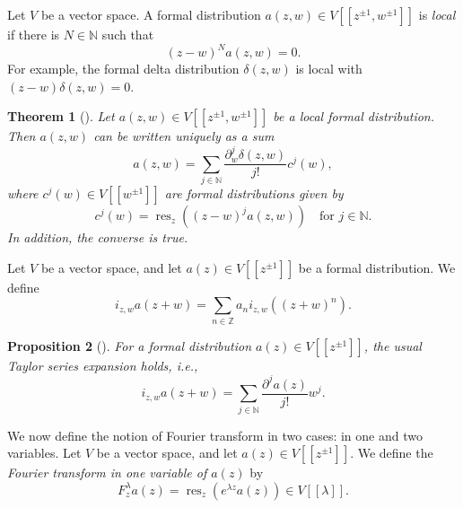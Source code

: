 \documentclass[a4paper, 12pt, reqno]{amsart}
\newtheorem{theorem}{Theorem}[section]
\newtheorem{proposition}[theorem]{Proposition}
\theoremstyle{remark}
\DeclareMathOperator{\res}{res}
\begin{document}
Let $V$ be a vector space.
A formal distribution $a(z, w) \in V[[z^{\pm1}, w^{\pm1}]]$ is \emph{local} if there is $N \in \mathbb{N}$ such that
\begin{equation*}
  (z - w)^Na(z, w) = 0.
\end{equation*}
For example, the formal delta distribution $\delta(z, w)$ is local with $(z - w)\delta(z, w) = 0$.

\begin{theorem}[{\cite[Proposition 2.2]{kac_vertex_1998}}]
  \label{thr:6}
  Let $a(z, w) \in V[[z^{\pm1}, w^{\pm1}]]$ be a local formal distribution.
  Then $a(z, w)$ can be written uniquely as a sum
  \begin{equation*}
    a(z, w) = \sum_{j \in \mathbb{N}}\frac{\partial_w^j\delta(z, w)}{j!}c^j(w),
  \end{equation*}
  where $c^j(w) \in V[[w^{\pm1}]]$ are formal distributions given by
  \begin{equation*}
    c^j(w) = \res_z((z - w)^ja(z, w)) \quad \text{for $j \in \mathbb{N}$}.
  \end{equation*}
  In addition, the converse is true.
\end{theorem}

Let $V$ be a vector space, and let $a(z) \in V[[z^{\pm1}]]$ be a formal distribution.
We define
\begin{equation*}
  i_{z, w}a(z + w) = \sum_{n \in \mathbb{Z}} a_ni_{z, w}((z + w)^n).
\end{equation*}

\begin{proposition}[{\cite[Proposition 3.4.1]{nozaradan_introduction_2008}}]
  \label{prp:1}
  For a formal distribution $a(z) \in V[[z^{\pm1}]]$, the usual Taylor series expansion holds, i.e.,
  \begin{equation*}
    i_{z, w}a(z + w) = \sum_{j \in \mathbb{N}}\frac{\partial^ja(z)}{j!}w^j.
  \end{equation*}
\end{proposition}

We now define the notion of Fourier transform in two cases: in one and two variables.
Let $V$ be a vector space, and let $a(z) \in V[[z^{\pm1}]]$.
We define the \emph{Fourier transform in one variable of $a(z)$} by
\begin{equation*}
  F^{\lambda}_za(z) = \res_z(e^{\lambda z}a(z)) \in V[[\lambda]].
\end{equation*}
\end{document}
